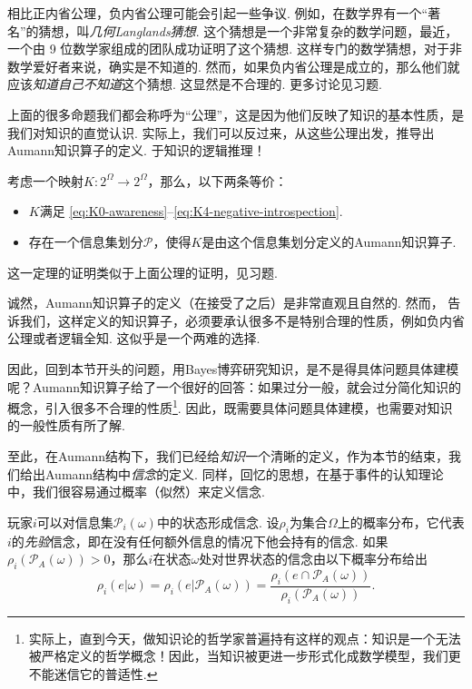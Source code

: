 相比正内省公理，负内省公理可能会引起一些争议. 例如，在数学界有一个“著名”的猜想，叫\emph{几何Langlands猜想}. 这个猜想是一个非常复杂的数学问题，最近，一个由 9 位数学家组成的团队成功证明了这个猜想. 这样专门的数学猜想，对于非数学爱好者来说，确实是不知道的. 然而，如果负内省公理是成立的，那么他们就应该\emph{知道自己不知道}这个猜想. 这显然是不合理的. 更多讨论见习题.

上面的很多命题我们都会称呼为“公理”，这是因为他们反映了知识的基本性质，是我们对知识的直觉认识. 实际上，我们可以反过来，从这些公理出发，推导出Aumann知识算子的定义. 
于知识的逻辑推理！

\begin{theorem}\label{thm:Aumann-operator-iff}
考虑一个映射$K:2^\Omega\to 2^\Omega$，那么，以下两条等价：
\begin{itemize}
    \item $K$满足 \eqref{eq:K0-awareness}--\eqref{eq:K4-negative-introspection}.
    \item 存在一个信息集划分$\mathcal P$，使得$K$是由这个信息集划分定义的Aumann知识算子.
\end{itemize}
\end{theorem}

这一定理的证明类似于上面公理的证明，见习题.

诚然，Aumann知识算子的定义（在接受了之后）是非常直观且自然的. 然而， 告诉我们，这样定义的知识算子，必须要承认很多不是特别合理的性质，例如负内省公理或者逻辑全知. 这似乎是一个两难的选择. 

因此，回到本节开头的问题，用Bayes博弈研究知识，是不是得具体问题具体建模呢？Aumann知识算子给了一个很好的回答：如果过分一般，就会过分简化知识的概念，引入很多不合理的性质\footnote{实际上，直到今天，做知识论的哲学家普遍持有这样的观点：知识是一个无法被严格定义的哲学概念！因此，当知识被更进一步形式化成数学模型，我们更不能迷信它的普适性.}. 因此，既需要具体问题具体建模，也需要对知识的一般性质有所了解.

至此，在Aumann结构下，我们已经给\emph{知识}一个清晰的定义，作为本节的结束，我们给出Aumann结构中\emph{信念}的定义. 同样，回忆的思想，在基于事件的认知理论中，我们很容易通过概率（似然）来定义信念. 

玩家$i$可以对信息集$\mathcal P_i(\omega)$中的状态形成信念. 设$\rho_i$为集合$\Omega$上的概率分布，它代表$i$的\emph{先验}信念，即在没有任何额外信息的情况下他会持有的信念. 如果$\rho_i(\mathcal P_A(\omega)) > 0$，那么$i$在状态$\omega$处对世界状态的信念由以下概率分布给出
\[\rho_i(e|\omega)=\rho_i(e|\mathcal P_A(\omega)) = \frac{\rho_i(e\cap\mathcal P_A(\omega))}{\rho_i(\mathcal P_A(\omega))}.\]

